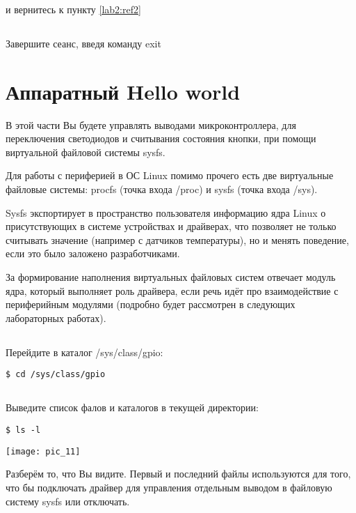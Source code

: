 и вернитесь к пункту \ref{lab2:ref2}

\subsection{}Завершите сеанс, введя команду exit 

\section{Аппаратный Hello world }

В этой части Вы будете управлять выводами микроконтроллера, для переключения светодиодов и считывания состояния кнопки, при помощи виртуальной файловой системы sysfs.

Для работы с периферией в ОС Linux помимо прочего есть две виртуальные файловые системы: procfs (точка входа /proc) и sysfs (точка входа /sys).  

Sysfs экспортирует в пространство пользователя информацию ядра Linux о присутствующих в системе устройствах и драйверах, что позволяет не только считывать значение (например с датчиков температуры), но и менять поведение, если это было заложено разработчиками.

За формирование наполнения виртуальных файловых систем отвечает модуль ядра, который выполняет роль драйвера, если речь идёт про взаимодействие с периферийным модулями (подробно будет рассмотрен в следующих лабораторных работах).

\subsection{}Перейдите в каталог /sys/class/gpio:
\begin{lstlisting}[style=bash]
$ cd /sys/class/gpio
\end{lstlisting}

\subsection{}Выведите список фалов и каталогов в текущей директории: 
\begin{lstlisting}[style=bash]
$ ls -l
\end{lstlisting}
\begin{center}
	\texttt{[image: pic\_11]}
\end{center}

Разберём то, что Вы видите. Первый и последний файлы используются для того, что бы подключать драйвер для управления отдельным выводом в файловую систему sysfs или отключать. 

